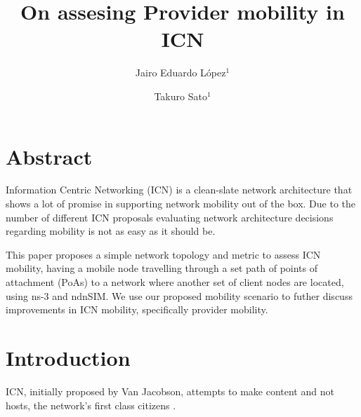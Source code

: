 \documentclass[twocolumn, a4paper]{ieicejsp}
\title{{\bf On assesing Provider mobility in ICN}}
\author{
    Jairo Eduardo L\'{o}pez$^1$ \\ \and
    Takuro Sato$^1$ 
}
\begin{document}
\maketitle

\section{Abstract}


Information Centric Networking (ICN) is a clean-slate network architecture that
shows a lot of promise in supporting network mobility out of the box.  Due to
the number of different ICN proposals evaluating network architecture decisions
regarding mobility is not as easy as it should be.

This paper proposes a simple network topology and metric to assess ICN mobility,
having a mobile node travelling through a set path of points of attachment
(PoAs) to a network where another set of client nodes are located, using ns-3
and ndnSIM. We use our proposed mobility scenario to futher discuss improvements
in ICN mobility, specifically provider mobility.

\section{Introduction}
ICN, initially proposed by Van Jacobson, attempts to make content and not hosts,
the network's first class citizens \cite{Jacobson:2009:NNC:1658939.1658941}.
 
\end{document}

